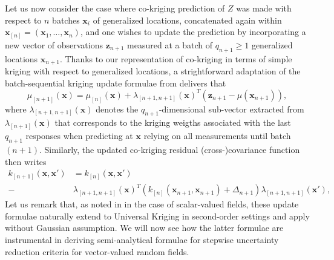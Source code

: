 \documentclass[aoas]{imsart}
\begin{document}
Let us now consider the case where co-kriging prediction of $Z$ was made with respect to $n$ batches $\bm{x}_i$ of generalized locations, concatenated again within
$\bm{x}_{[n]}=(\bm{x}_1,\dots, \bm{x}_n)$, and one wishes to update the prediction by incorporating a new vector of observations $\mathbf{z}_{n+1}$ measured at a batch of $q_{n+1} \geq 1$ generalized locations $\bm{x}_{n+1}$.
Thanks to our representation of co-kriging in terms of simple kriging with respect to generalized locations, a strightforward adaptation of the batch-sequential kriging update formulae from \citep{Chevalier.etal2013a} delivers that
% 
\begin{equation}\label{eq:meanCoK}
\mu_{[n+1]}(\bm{x})=\mu_{[n]}(\bm{x})+\lambda_{[n+1,n+1]}(\bm{x})^T (\mathbf{z}_{n+1}-\mu(\bm{x}_{n+1})),
\end{equation}
where $\lambda_{[n+1,n+1]}(\bm{x})$ denotes the $q_{n+1}$-dimensional sub-vector extracted from
$\lambda_{[n+1]}(\bm{x})$ that corresponds to the kriging weigths associated with the last $q_{n+1}$ responses when 
predicting at $\bm{x}$ relying on all measurements until batch $(n+1)$.
Similarly, the updated co-kriging residual (cross-)covariance function then writes
\begin{align}\label{eq:varCoK}
k_{[n+1]}(\bm{x},\bm{x}') & = k_{[n]}(\bm{x},\bm{x}')\\
 \nonumber - & \lambda_{[n+1,n+1]}(\bm{x})^T 
\left(k_{[n]}(\bm{x}_{n+1}, \bm{x}_{n+1})+\Delta_{n+1}\right)
\lambda_{{[n+1,n+1]}}(\bm{x}'),
\end{align}
%
Let us remark that, as noted in \citep{Chevalier2015} in the case of scalar-valued fields, these update formulae naturally 
extend to Universal Kriging in second-order settings and apply without Gaussian assumption. We will now see how the latter formulae are instrumental in deriving semi-analytical formulae for stepwise uncertainty reduction criteria for 
vector-valued random fields.
\end{document}
